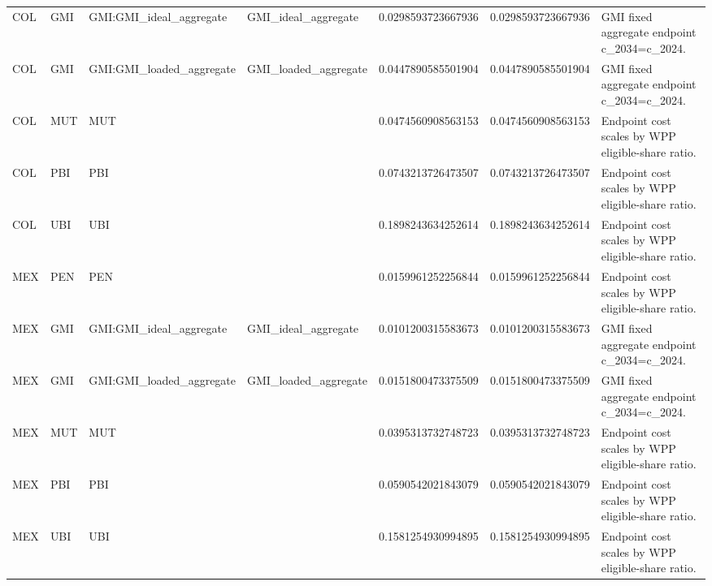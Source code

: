 \begin{table}[!htbp]
\begin{tabular}{lllllll}
COL & GMI & GMI:GMI\_ideal\_aggregate & GMI\_ideal\_aggregate & 0.0298593723667936 & 0.0298593723667936 & GMI fixed aggregate endpoint c\_2034=c\_2024. \\
COL & GMI & GMI:GMI\_loaded\_aggregate & GMI\_loaded\_aggregate & 0.0447890585501904 & 0.0447890585501904 & GMI fixed aggregate endpoint c\_2034=c\_2024. \\
COL & MUT & MUT &  & 0.0474560908563153 & 0.0474560908563153 & Endpoint cost scales by WPP eligible-share ratio. \\
COL & PBI & PBI &  & 0.0743213726473507 & 0.0743213726473507 & Endpoint cost scales by WPP eligible-share ratio. \\
COL & UBI & UBI &  & 0.1898243634252614 & 0.1898243634252614 & Endpoint cost scales by WPP eligible-share ratio. \\
MEX & PEN & PEN &  & 0.0159961252256844 & 0.0159961252256844 & Endpoint cost scales by WPP eligible-share ratio. \\
MEX & GMI & GMI:GMI\_ideal\_aggregate & GMI\_ideal\_aggregate & 0.0101200315583673 & 0.0101200315583673 & GMI fixed aggregate endpoint c\_2034=c\_2024. \\
MEX & GMI & GMI:GMI\_loaded\_aggregate & GMI\_loaded\_aggregate & 0.0151800473375509 & 0.0151800473375509 & GMI fixed aggregate endpoint c\_2034=c\_2024. \\
MEX & MUT & MUT &  & 0.0395313732748723 & 0.0395313732748723 & Endpoint cost scales by WPP eligible-share ratio. \\
MEX & PBI & PBI &  & 0.0590542021843079 & 0.0590542021843079 & Endpoint cost scales by WPP eligible-share ratio. \\
MEX & UBI & UBI &  & 0.1581254930994895 & 0.1581254930994895 & Endpoint cost scales by WPP eligible-share ratio. \\
\bottomrule
\end{tabular}
\end{table}
